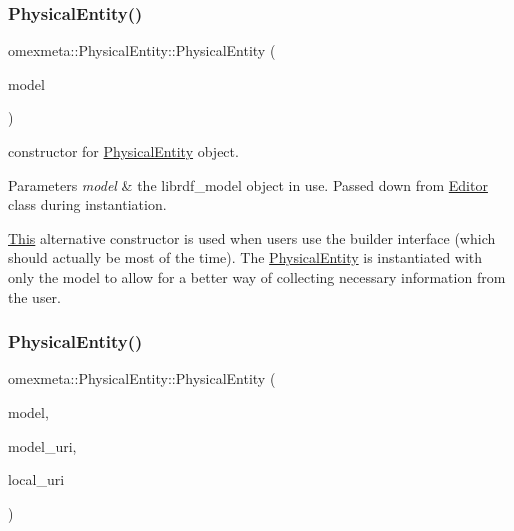 \subsubsection{\texorpdfstring{Physical\+Entity()}{PhysicalEntity()}\hspace{0.1cm}{\footnotesize\ttfamily [3/4]}}
{\footnotesize\ttfamily omexmeta\+::\+Physical\+Entity\+::\+Physical\+Entity (\begin{DoxyParamCaption}\item[{librdf\+\_\+model $\ast$}]{model }\end{DoxyParamCaption})\hspace{0.3cm}{\ttfamily [explicit]}}



constructor for \hyperlink{classomexmeta_1_1PhysicalEntity}{Physical\+Entity} object. 


\begin{DoxyParams}{Parameters}
{\em model} & the librdf\+\_\+model object in use. Passed down from \hyperlink{classomexmeta_1_1Editor}{Editor} class during instantiation.\\
\hline
\end{DoxyParams}
\hyperlink{classThis}{This} alternative constructor is used when users use the builder interface (which should actually be most of the time). The \hyperlink{classomexmeta_1_1PhysicalEntity}{Physical\+Entity} is instantiated with only the model to allow for a better way of collecting necessary information from the user. \mbox{\label{classomexmeta_1_1PhysicalEntity_a5f583e60ad44bbb3dfcd11fdc6bc72cc}} 
\subsubsection{\texorpdfstring{Physical\+Entity()}{PhysicalEntity()}\hspace{0.1cm}{\footnotesize\ttfamily [4/4]}}
{\footnotesize\ttfamily omexmeta\+::\+Physical\+Entity\+::\+Physical\+Entity (\begin{DoxyParamCaption}\item[{librdf\+\_\+model $\ast$}]{model,  }\item[{const std\+::string \&}]{model\+\_\+uri,  }\item[{const std\+::string \&}]{local\+\_\+uri }\end{DoxyParamCaption})\hspace{0.3cm}{\ttfamily [explicit]}}



